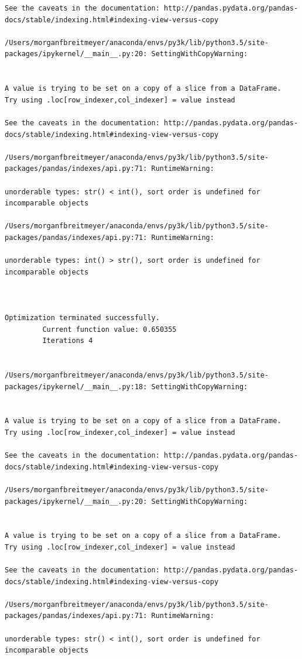 \begin{lstlisting}
See the caveats in the documentation: http://pandas.pydata.org/pandas-docs/stable/indexing.html#indexing-view-versus-copy

/Users/morganfbreitmeyer/anaconda/envs/py3k/lib/python3.5/site-packages/ipykernel/__main__.py:20: SettingWithCopyWarning:


A value is trying to be set on a copy of a slice from a DataFrame.
Try using .loc[row_indexer,col_indexer] = value instead

See the caveats in the documentation: http://pandas.pydata.org/pandas-docs/stable/indexing.html#indexing-view-versus-copy

/Users/morganfbreitmeyer/anaconda/envs/py3k/lib/python3.5/site-packages/pandas/indexes/api.py:71: RuntimeWarning:

unorderable types: str() < int(), sort order is undefined for incomparable objects

/Users/morganfbreitmeyer/anaconda/envs/py3k/lib/python3.5/site-packages/pandas/indexes/api.py:71: RuntimeWarning:

unorderable types: int() > str(), sort order is undefined for incomparable objects



Optimization terminated successfully.
         Current function value: 0.650355
         Iterations 4


/Users/morganfbreitmeyer/anaconda/envs/py3k/lib/python3.5/site-packages/ipykernel/__main__.py:18: SettingWithCopyWarning:


A value is trying to be set on a copy of a slice from a DataFrame.
Try using .loc[row_indexer,col_indexer] = value instead

See the caveats in the documentation: http://pandas.pydata.org/pandas-docs/stable/indexing.html#indexing-view-versus-copy

/Users/morganfbreitmeyer/anaconda/envs/py3k/lib/python3.5/site-packages/ipykernel/__main__.py:20: SettingWithCopyWarning:


A value is trying to be set on a copy of a slice from a DataFrame.
Try using .loc[row_indexer,col_indexer] = value instead

See the caveats in the documentation: http://pandas.pydata.org/pandas-docs/stable/indexing.html#indexing-view-versus-copy

/Users/morganfbreitmeyer/anaconda/envs/py3k/lib/python3.5/site-packages/pandas/indexes/api.py:71: RuntimeWarning:

unorderable types: str() < int(), sort order is undefined for incomparable objects


\end{lstlisting}
